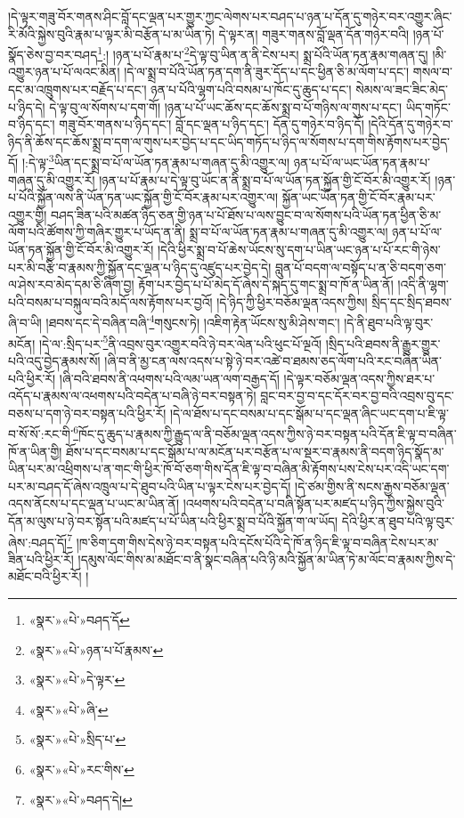 །དེ་ལྟར་གཟུ་བོར་གནས་ཤིང་བློ་དང་ལྡན་པར་གྱུར་ཀྱང་ལེགས་པར་བཤད་པ་ཉན་པ་དོན་དུ་གཉེར་བར་འགྱུར་ཞིང་རི་མོའི་སྐྱེས་བུའི་རྣམ་པ་ལྟར་མི་བརྩོན་པ་མ་ཡིན་ཏེ། དེ་ལྟར་ན། གཟུར་གནས་བློ་ལྡན་དོན་གཉེར་བའི། །ཉན་པོ་སྣོད་ཅེས་བྱ་བར་བཤད\footnote{«སྣར་»«པེ་»བཤད་དོ}:། །ཉན་པ་པོ་རྣམ་པ་\footnote{«སྣར་»«པེ་»ཉན་པ་པོ་རྣམས་}དེ་ལྟ་བུ་ཡིན་ན་ནི་ངེས་པར། སྨྲ་པོའི་ཡོན་ཏན་རྣམ་གཞན་དུ། །མི་འགྱུར་ཉན་པ་པོ་ལའང་མིན། །དེ་ལ་སྨྲ་བ་པོའི་ཡོན་ཏན་དག་ནི་ཟུར་དོད་པ་དང་ཕྱིན་ཅི་མ་ལོག་པ་དང་། གསལ་བ་དང་མ་འཁྲུགས་པར་བརྗོད་པ་དང་། ཉན་པ་པོའི་ལྷག་པའི་བསམ་པ་ཁོང་དུ་ཆུད་པ་དང་། སེམས་ལ་ཟང་ཟིང་མེད་པ་ཉིད་དེ། དེ་ལྟ་བུ་ལ་སོགས་པ་དག་གོ། །ཉན་པ་པོ་ཡང་ཆོས་དང་ཆོས་སྨྲ་བ་པོ་གཉིས་ལ་གུས་པ་དང་། ཡིད་གཏོང་བ་ཉིད་དང་། གཟུ་བོར་གནས་པ་ཉིད་དང་། བློ་དང་ལྡན་པ་ཉིད་དང་། དོན་དུ་གཉེར་བ་ཉིད་དོ། །དེའི་དོན་དུ་གཉེར་བ་ཉིད་ནི་ཆོས་དང་ཆོས་སྨྲ་བ་དག་ལ་གུས་པར་བྱེད་པ་དང་ཡིད་གཏོད་པ་ཉིད་ལ་སོགས་པ་དག་གིས་རྟོགས་པར་བྱེད་དོ། །:དེ་ལྟ་\footnote{«སྣར་»«པེ་»དེ་ལྟར་}ཡིན་དང་སྨྲ་བ་པོ་ལ་ཡོན་ཏན་རྣམ་པ་གཞན་དུ་མི་འགྱུར་ལ། ཉན་པ་པོ་ལ་ཡང་ཡོན་ཏན་རྣམ་པ་གཞན་དུ་མི་འགྱུར་རོ། །ཉན་པ་པོ་རྣམ་པ་དེ་ལྟ་བུ་ཡོང་ན་ནི་སྨྲ་བ་པོ་ལ་ཡོན་ཏན་སྐྱོན་གྱི་ངོ་བོར་མི་འགྱུར་རོ། །ཉན་པ་པོའི་སྐྱོན་ལས་ནི་ཡོན་ཏན་ཡང་སྐྱོན་གྱི་ངོ་བོར་རྣམ་པར་འགྱུར་ལ། སྐྱོན་ཡང་ཡོན་ཏན་གྱི་ངོ་བོར་རྣམ་པར་འགྱུར་གྱི། བཤད་ཟིན་པའི་མཚན་ཉིད་ཅན་གྱི་ཉན་པ་པོ་ཐོས་པ་ལས་བྱུང་བ་ལ་སོགས་པའི་ཡོན་ཏན་ཕྱིན་ཅི་མ་ལོག་པའི་ཚོགས་ཀྱི་གཞིར་གྱུར་པ་ཡོད་ན་ནི། སྨྲ་བ་པོ་ལ་ཡོན་ཏན་རྣམ་པ་གཞན་དུ་མི་འགྱུར་ལ། ཉན་པ་པོ་ལ་ཡོན་ཏན་སྐྱོན་གྱི་ངོ་བོར་མི་འགྱུར་རོ། །དེའི་ཕྱིར་སྨྲ་བ་པོ་ཆེས་ཡོངས་སུ་དག་པ་ཡིན་ཡང་ཉན་པ་པོ་རང་གི་ཉེས་པར་མི་བརྩི་བ་རྣམས་ཀྱི་སྐྱོན་དང་ལྡན་པ་ཉིད་དུ་འཛུད་པར་བྱེད་དེ། བླུན་པོ་བདག་ལ་བསྟོད་པ་ན་ཅི་བདག་ཅག་ལ་ཤེས་རབ་མེད་དམ་ཅི་ཞིག་བྱ། རྟོག་པར་བྱེད་པ་པོ་མེད་དོ་ཞེས་དེ་སྐད་དུ་གང་སྨྲ་བ་ཁོ་ན་ཡིན་ནོ། །འདི་ནི་ལྷག་པའི་བསམ་པ་བསྐུལ་བའི་མདོ་ལས་རྟོགས་པར་བྱའོ། །དེ་ཉིད་ཀྱི་ཕྱིར་བཅོམ་ལྡན་འདས་ཀྱིས། སྲིད་དང་སྲིད་ཐབས་ཞི་བ་ཡི། །ཐབས་དང་དེ་བཞིན་བཞི་\footnote{«སྣར་»«པེ་»ཞི་}གསུངས་ཏེ། །འཇིག་རྟེན་ཡོངས་སུ་མི་ཤེས་གང་། །དེ་ནི་ཐུབ་པའི་ལྟ་བུར་མངོན། །དེ་ལ་:སྲིད་པར་\footnote{«སྣར་»«པེ་»སྲིད་པ་}ནི་འབྲས་བུར་འགྱུར་བའི་ཉེ་བར་ལེན་པའི་ཕུང་པོ་ལྔའོ། །སྲིད་པའི་ཐབས་ནི་རྒྱུར་གྱུར་པའི་འདུ་བྱེད་རྣམས་སོ། །ཞི་བ་ནི་མྱ་ངན་ལས་འདས་པ་སྟེ་ཉེ་བར་འཚེ་བ་ཐམས་ཅད་ལོག་པའི་རང་བཞིན་ཡིན་པའི་ཕྱིར་རོ། །ཞི་བའི་ཐབས་ནི་འཕགས་པའི་ལམ་ཡན་ལག་བརྒྱད་དོ། །དེ་ལྟར་བཅོམ་ལྡན་འདས་ཀྱིས་ཐར་པ་འདོད་པ་རྣམས་ལ་འཕགས་པའི་བདེན་པ་བཞི་ཉེ་བར་བསྟན་ཏེ། བླང་བར་བྱ་བ་དང་དོར་བར་བྱ་བའི་འབྲས་བུ་དང་བཅས་པ་དག་ཉེ་བར་བསྟན་པའི་ཕྱིར་རོ། །དེ་ལ་ཐོས་པ་དང་བསམ་པ་དང་སྒོམ་པ་དང་ལྡན་ཞིང་ཡང་དག་པ་ཇི་ལྟ་བ་སོ་སོ་:རང་གི་\footnote{«སྣར་»«པེ་»རང་གིས་}ཁོང་དུ་ཆུད་པ་རྣམས་ཀྱི་རྒྱུད་ལ་ནི་བཅོམ་ལྡན་འདས་ཀྱིས་ཉེ་བར་བསྟན་པའི་དོན་ཇི་ལྟ་བ་བཞིན་ཁོ་ན་ཡིན་གྱི། ཐོས་པ་དང་བསམ་པ་དང་སྒོམ་པ་ལ་མངོན་པར་བརྩོན་པ་ལ་སྡར་བ་རྣམས་ནི་བདག་ཉིད་སྣོད་མ་ཡིན་པར་མ་འཕྲིགས་པ་ན་གང་གི་ཕྱིར་ཁོ་བོ་ཅག་གིས་དོན་ཇི་ལྟ་བ་བཞིན་མི་རྟོགས་པས་ངེས་པར་འདི་ཡང་དག་པར་མ་བཤད་དོ་ཞེས་འཁྲུལ་པ་དེ་ཐུབ་པའི་ཡིན་པ་ལྟར་ངེས་པར་བྱེད་དོ། །དེ་ཙམ་གྱིས་ནི་སངས་རྒྱས་བཅོམ་ལྡན་འདས་ནོངས་པ་དང་ལྡན་པ་ཡང་མ་ཡིན་ནོ། །འཕགས་པའི་བདེན་པ་བཞི་སྟོན་པར་མཛད་པ་ཉིད་ཀྱིས་སྐྱེས་བུའི་དོན་མ་ལུས་པ་ཉེ་བར་སྟོན་པའི་མཛད་པ་པོ་ཡིན་པའི་ཕྱིར་སྨྲ་བ་པོའི་སྐྱོན་ག་ལ་ཡོད། དེའི་ཕྱིར་ན་ཐུབ་པའི་ལྟ་བུར་ཞེས་:བཤད་དོ།\footnote{«སྣར་»«པེ་»བཤད་དེ།} །ཁ་ཅིག་དག་གིས་དེས་ཉེ་བར་བསྟན་པའི་དངོས་པོའི་དེ་ཁོ་ན་ཉིད་ཇི་ལྟ་བ་བཞིན་ངེས་པར་མ་ཟིན་པའི་ཕྱིར་རོ། །དམུས་ལོང་གིས་མ་མཐོང་བ་ནི་སྣང་བཞིན་པའི་ཉི་མའི་སྐྱོན་མ་ཡིན་ཏེ་མ་ལོང་བ་རྣམས་ཀྱིས་དེ་མཐོང་བའི་ཕྱིར་རོ། །
